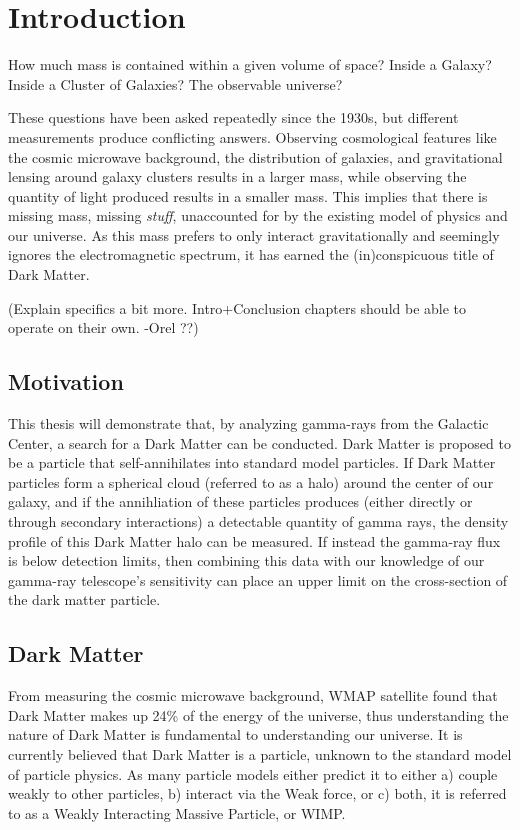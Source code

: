 \cleartooddpage[\thispagestyle{empty}]
\chapter{Introduction}

  How much mass is contained within a given volume of space?
  Inside a Galaxy?
  Inside a Cluster of Galaxies?
  The observable universe?

  These questions have been asked repeatedly since the 1930s, but different measurements produce conflicting answers.
  Observing cosmological features like the cosmic microwave background, the distribution of galaxies, and gravitational lensing around galaxy clusters results in a larger mass, while observing the quantity of light produced results in a smaller mass.
  This implies that there is missing mass, missing \textit{stuff}, unaccounted for by the existing model of physics and our universe.
  As this mass prefers to only interact gravitationally and seemingly ignores the electromagnetic spectrum, it has earned the (in)conspicuous title of Dark Matter.

  {\color{red}(Explain specifics a bit more.  Intro+Conclusion chapters should be able to operate on their own. -Orel ??)}

\section{Motivation}
  This thesis will demonstrate that, by analyzing gamma-rays from the Galactic Center, a search for a Dark Matter can be conducted.
  Dark Matter is proposed to be a particle that self-annihilates into standard model particles.
  If Dark Matter particles form a spherical cloud (referred to as a halo) around the center of our galaxy, and if the annihliation of these particles produces (either directly or through secondary interactions) a detectable quantity of gamma rays, the density profile of this Dark Matter halo can be measured.
  If instead the gamma-ray flux is below detection limits, then combining this data with our knowledge of our gamma-ray telescope's sensitivity can place an upper limit on the cross-section of the dark matter particle.

\section{Dark Matter}

  From measuring the cosmic microwave background, WMAP satellite found that Dark Matter makes up 24\% of the energy of the universe\cite{pdg_2012}, thus understanding the nature of Dark Matter is fundamental to understanding our universe.
  It is currently believed that Dark Matter is a particle, unknown to the standard model of particle physics.
  As many particle models either predict it to either a) couple weakly to other particles, b) interact via the Weak force, or c) both, it is referred to as a Weakly Interacting Massive Particle, or WIMP.

